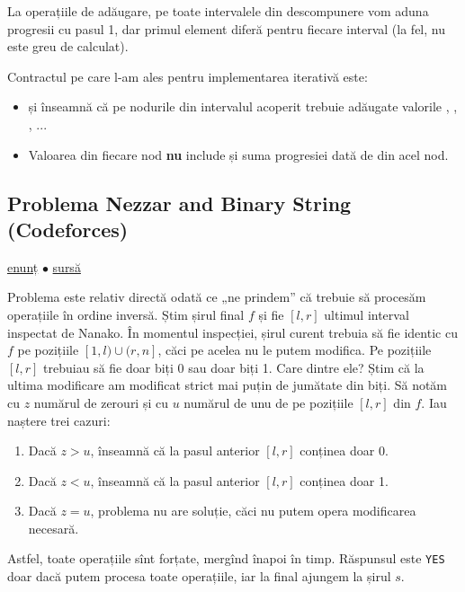 La operațiile de adăugare, pe toate intervalele din descompunere vom aduna progresii cu pasul 1, dar primul element diferă pentru fiecare interval (la fel, nu este greu de calculat).

Contractul pe care l-am ales pentru implementarea iterativă este:

\begin{itemize}
  \item {} și  înseamnă că pe nodurile din intervalul acoperit trebuie adăugate valorile , , , ...
  \item Valoarea  din fiecare nod \textbf{nu} include și suma progresiei dată de  din acel nod.
\end{itemize}

\subsection{Problema Nezzar and Binary String (Codeforces)}
\label{problem:nezzar-and-binary-string}

\href{https://codeforces.com/contest/1478/problem/E}{enunț}
$\bullet$
\hyperref[code:nezzar-and-binary-string]{sursă}

Problema este relativ directă odată ce „ne prindem” că trebuie să procesăm operațiile în ordine inversă. Știm șirul final $f$ și fie $[l, r]$ ultimul interval inspectat de Nanako. În momentul inspecției, șirul curent trebuia să fie identic cu $f$ pe pozițiile $[1, l) \cup (r,n]$, căci pe acelea nu le putem modifica. Pe pozițiile $[l, r]$ trebuiau să fie doar biți 0 sau doar biți 1. Care dintre ele? Știm că la ultima modificare am modificat strict mai puțin de jumătate din biți. Să notăm cu $z$ numărul de zerouri și cu $u$ numărul de unu de pe pozițiile $[l,r]$ din $f$. Iau naștere trei cazuri:

\begin{enumerate}
  \item Dacă $z > u$, înseamnă că la pasul anterior $[l,r]$ conținea doar 0.
  \item Dacă $z < u$, înseamnă că la pasul anterior $[l,r]$ conținea doar 1.
  \item Dacă $z = u$, problema nu are soluție, căci nu putem opera modificarea necesară.
\end{enumerate}

Astfel, toate operațiile sînt forțate, mergînd înapoi în timp. Răspunsul este \texttt{YES} doar dacă putem procesa toate operațiile, iar la final ajungem la șirul $s$.

